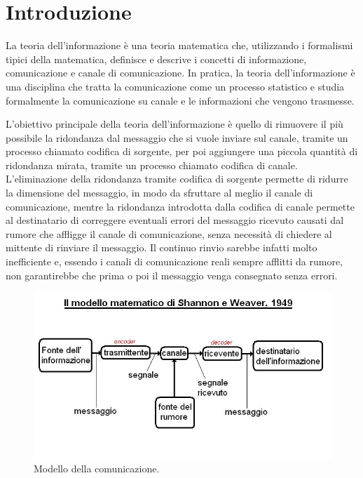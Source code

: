 \chapter{Introduzione}
La teoria dell'informazione è una teoria matematica che, utilizzando i
formalismi tipici della matematica, definisce e descrive i concetti
di informazione, comunicazione e canale di comunicazione. In pratica,
la teoria dell'informazione è una disciplina che tratta la comunicazione
come un processo statistico e studia formalmente la comunicazione su canale
e le informazioni che vengono trasmesse.

L'obiettivo principale della teoria dell'informazione è quello di rimuovere
il più possibile la ridondanza dal messaggio che si vuole inviare sul canale,
tramite un processo chiamato codifica di sorgente, per poi aggiungere
una piccola quantità di ridondanza mirata, tramite un processo chiamato
codifica di canale. L'eliminazione della ridondanza tramite codifica di
sorgente permette di ridurre la dimensione del messaggio, in modo
da sfruttare al meglio il canale di comunicazione, mentre la ridondanza
introdotta dalla codifica di canale permette al destinatario di correggere
eventuali errori del messaggio ricevuto causati dal rumore che affligge il canale
di comunicazione, senza necessità di chiedere al mittente di rinviare il messaggio.
Il continuo rinvio sarebbe infatti molto inefficiente e, essendo i canali
di comunicazione reali sempre afflitti da rumore, non garantirebbe che prima
o poi il messaggio venga consegnato senza errori.

\begin{figure}
    \centering
    \includegraphics[width=\linewidth]{img/communication-model.jpg}
    \caption{Modello della comunicazione.}
    \label{fig:communication-model}
\end{figure}

